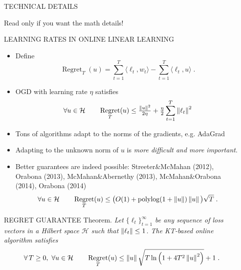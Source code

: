 \documentclass[final,t,serif,mathserif]{beamer}
\renewcommand{\H}{\mathcal{H}}  %
\DeclareMathOperator{\Regret}{Regret}
\DeclareMathOperator{\polylog}{polylog}
\def\spaziooo{\vspace{-0.cm}}
\begin{document}
\begin{frame}{}
\begin{columns}[t]
\begin{column}{.33\linewidth}
    

    

    
    \end{column}
    
    
    
    \begin{column}{.33\linewidth}

    
    \begin{block}{TECHNICAL DETAILS}
    \begin{minipage}{.98\linewidth}
    
    Read only if you want the math details!
    
    \begin{block}{LEARNING RATES IN ONLINE LINEAR LEARNING}
    \spaziooo
    \begin{itemize}
      \item Define
      \[
        \Regret_T(u) = \sum_{t=1}^T \langle \ell_t, w_t \rangle - \sum_{t=1}^T \langle \ell_t, u \rangle  \; .
      \]
      \item OGD with learning rate $\eta$ satisfies
	\[
	\forall u \in \H \qquad \Regret_T(u) \le \tfrac{\norm{u}^2}{2\eta} + \tfrac{\eta}{2} \sum_{t=1}^T \norm{\ell_t}^2
	\]
      \item Tons of algorithms adapt to the norms of the gradients, e.g. AdaGrad
      \item Adapting to the unknown norm of $u$ is \emph{more difficult and more important}.
      \item Better guarantees are indeed possible: Streeter\&McMahan (2012), Orabona (2013), McMahan\&Abernethy (2013), McMahan\&Orabona (2014), Orabona (2014) 
	\[
	\forall u \in \H \qquad \Regret_T(u) \le \big(O(1)+\polylog(1 + \norm{u})\norm{u} \big) \sqrt{T} \; .
	\]
    \end{itemize}
    \spaziooo
    \end{block}
    

    \begin{block}{REGRET GUARANTEE}
    \spaziooo
    \alert{Theorem.} \emph{
	Let $\{\ell_t\}_{t=1}^\infty$ be any sequence of loss vectors
	in a Hilbert space $\H$ such that $\left\|{\ell_t}\right\| \le 1$.
	The KT-based online algorithm satisfies
	$$
	\forall \, T \ge 0, \
	\forall u \in \H \qquad
	\Regret_T(u) \le \norm{u} \sqrt{T \ln\left(1 + 4T^2 \norm{u}^2 \right)} + 1 \;.
	$$
    }
    
    \vspace{1cm}
    

\end{block}
\end{minipage}
\end{block}
\end{column}
\end{columns}
\end{frame}
\end{document}
